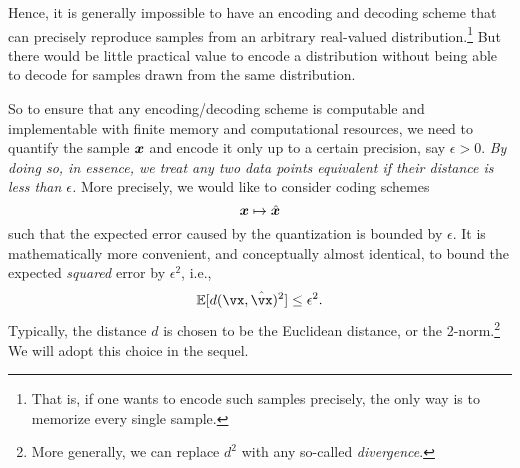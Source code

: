\documentclass[../../book-main.tex]{subfiles}
\begin{document}
Hence, it is generally impossible to have an encoding and decoding scheme that can precisely reproduce samples from an arbitrary real-valued distribution.\footnote{That is, if one wants to encode such samples precisely, the only way is to memorize every single sample. } But there would be little practical value to encode a distribution without being able to decode for samples drawn from the same distribution.

So to ensure that any encoding/decoding scheme is computable and implementable
with finite memory and computational resources, we need to quantify the sample $\bm{x}$ and encode it only up to a certain precision, say $\epsilon > 0$. {\em By doing so, in essence, we treat any two data points equivalent if their distance is less than $\epsilon$.} More precisely, we would like to consider coding schemes
\begin{equation}
	\bm{x} \mapsto \hat {\bm{x}}
\end{equation}
such that the expected error caused by the quantization is bounded by $\epsilon$. It is mathematically more convenient, and conceptually almost identical, to bound the expected \textit{squared} error by \(\epsilon^{2}\), i.e., 
\begin{equation}
	\Ex[d(\vx, \hat \vx)^{2}] \le \epsilon^{2}.
\end{equation}
Typically, the distance \(d\) is chosen to be the Euclidean distance, or the
2-norm.\footnote{More generally, we can replace \(d^{2}\) with any so-called
\textit{divergence}.} We will adopt this choice in the sequel.
\end{document}

